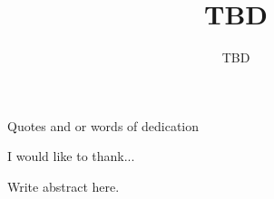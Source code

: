 \documentclass[11pt, fullpage]{report}
\newcommand{\refname}{Bibliography}
\begin{document}
    \title{TBD}
    \author{TBD} %
    \cochairfalse
    \threereaderstrue
    \fourreadersfalse
    \fivereadersfalse
    \figurelisttrue
    \tablelisttrue %
    
\copyrighttrue
\makecoverpages




\dominitoc %


 \begin{dedication} %
       Quotes and or words of dedication
\end{dedication}
    
\begin{acknowledgements} %
        I would like to thank...
\end{acknowledgements}

\abstract
       Write abstract here.
\endabstract


\makecontentspages


\chapterpages   
{}\newpage\setcounter{page}{1}
\clearpage
    






%




%
%



\clearpage\singlespacing
\printbibliography[heading=bibintoc]
\end{document}
